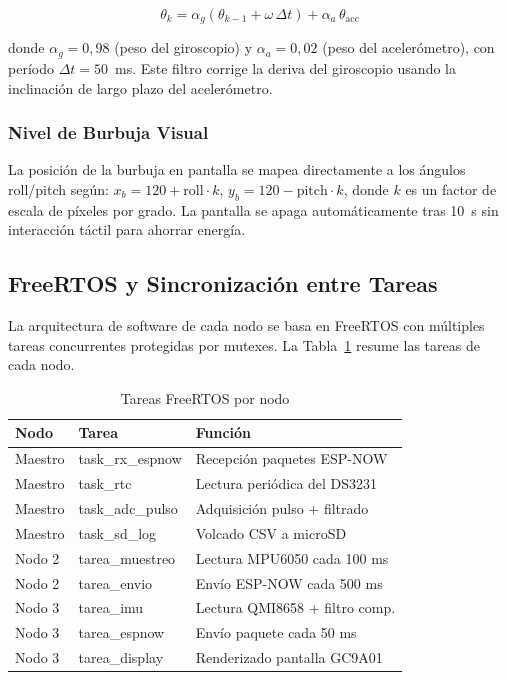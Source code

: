 \documentclass[10pt,twocolumn,a4paper]{article}
\begin{document}
\begin{equation}
  \theta_k = \alpha_g(\theta_{k-1} + \omega\,\Delta t) + \alpha_a\,\theta_{\text{acc}}
  \label{eq:comp}
\end{equation}

donde $\alpha_g=0{,}98$ (peso del giroscopio) y $\alpha_a=0{,}02$ (peso
del acelerómetro), con período $\Delta t=50$~ms. Este filtro corrige la
deriva del giroscopio usando la inclinación de largo plazo del
acelerómetro.

\subsubsection{Nivel de Burbuja Visual}

La posición de la burbuja en pantalla se mapea directamente a los
ángulos roll/pitch según:
$x_b = 120 + \text{roll}\cdot k$,
$y_b = 120 - \text{pitch}\cdot k$,
donde $k$ es un factor de escala de píxeles por grado. La pantalla
se apaga automáticamente tras 10~s sin interacción táctil para
ahorrar energía.

\subsection{FreeRTOS y Sincronización entre Tareas}

La arquitectura de software de cada nodo se basa en FreeRTOS con
múltiples tareas concurrentes protegidas por mutexes. La
Tabla~\ref{tab:tareas} resume las tareas de cada nodo.

\begin{table}[H]
\centering
\caption{Tareas FreeRTOS por nodo}
\label{tab:tareas}
\scriptsize
\begin{tabular}{p{1.5cm}p{2.0cm}p{2.7cm}}
\toprule
\textbf{Nodo} & \textbf{Tarea} & \textbf{Función} \\
\midrule
Maestro & task\_rx\_espnow & Recepción paquetes ESP-NOW \\
Maestro & task\_rtc & Lectura periódica del DS3231 \\
Maestro & task\_adc\_pulso & Adquisición pulso + filtrado \\
Maestro & task\_sd\_log & Volcado CSV a microSD \\
Nodo 2 & tarea\_muestreo & Lectura MPU6050 cada 100 ms \\
Nodo 2 & tarea\_envio & Envío ESP-NOW cada 500 ms \\
Nodo 3 & tarea\_imu & Lectura QMI8658 + filtro comp. \\
Nodo 3 & tarea\_espnow & Envío paquete cada 50 ms \\
Nodo 3 & tarea\_display & Renderizado pantalla GC9A01 \\
\bottomrule
\end{tabular}
\end{table}
\end{document}
